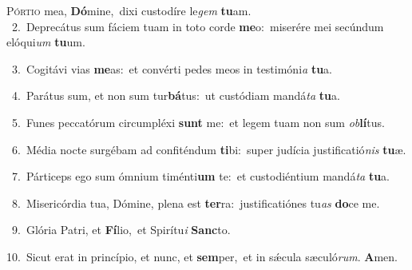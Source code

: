 \lettrine{\initial\textcolor{\initialcolor}{P}}{órtio} mea, \textbf{Dó}\-mine,~\star dixi custodíre le\textit{gem} \textbf{tu}\-am.\\
{\numbfont\textcolor{\numbcolor}{~2.}}~Deprecátus sum fáciem tuam in toto corde \textbf{me}\-o:~\star miserére mei secúndum elóqui\textit{um} \textbf{tu}\-um.\par
{\numbfont\textcolor{\numbcolor}{~3.}}~Cogitávi vias \textbf{me}\-as:~\star et convérti pedes meos in testimóni\textit{a} \textbf{tu}\-a.\par
{\numbfont\textcolor{\numbcolor}{~4.}}~Parátus sum, et non sum tur\-\textbf{bá}\-tus:~\star ut custódiam mandá\textit{ta} \textbf{tu}\-a.\par
{\numbfont\textcolor{\numbcolor}{~5.}}~Funes peccatórum circumpléxi \textbf{sunt} me:~\star et legem tuam non sum \textit{ob}\-\textbf{lí}tus.\par
{\numbfont\textcolor{\numbcolor}{~6.}}~Média nocte surgébam ad confiténdum \textbf{ti}\-bi:~\star super judícia justificatió\textit{nis} \textbf{tu}\-æ.\par
{\numbfont\textcolor{\numbcolor}{~7.}}~Párticeps ego sum ómnium timénti\textbf{um} te:~\star et custodiéntium mandá\textit{ta} \textbf{tu}\-a.\par
{\numbfont\textcolor{\numbcolor}{~8.}}~Misericórdia tua, Dómine, plena est \textbf{ter}\-ra:~\star justificatiónes tu\textit{as} \textbf{do}\-ce me.\par
{\numbfont\textcolor{\numbcolor}{~9.}}~Glória Patri, et \textbf{Fí}\-lio,~\star et Spirítu\textit{i} \textbf{Sanc}\-to.\par
{\numbfont\textcolor{\numbcolor}{10.}}~Sicut erat in princípio, et nunc, et \textbf{sem}\-per,~\star et in sǽcula sæculó\-\textit{rum}\-. \textbf{A}\-men.\par
